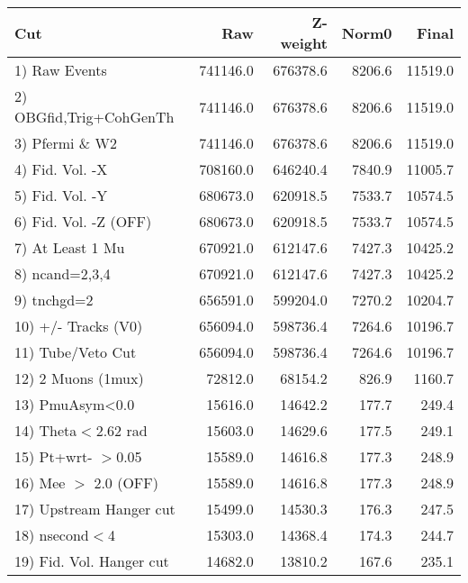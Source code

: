  \begin{table}[h!]\centering
 \begin{tabular}{||l||r|r|r|r||}
 \hline
 \hline
 Cut & Raw & Z-weight & Norm0 & Final \\
 \hline
  1) Raw Events           &    741146.0 &    676378.6 &      8206.6 &     11519.0 \\
  2) OBGfid,Trig+CohGenTh &    741146.0 &    676378.6 &      8206.6 &     11519.0 \\
  3) Pfermi \& W2         &    741146.0 &    676378.6 &      8206.6 &     11519.0 \\
  4) Fid. Vol. -X         &    708160.0 &    646240.4 &      7840.9 &     11005.7 \\
  5) Fid. Vol. -Y         &    680673.0 &    620918.5 &      7533.7 &     10574.5 \\
  6) Fid. Vol. -Z (OFF)   &    680673.0 &    620918.5 &      7533.7 &     10574.5 \\
  7) At Least 1 Mu        &    670921.0 &    612147.6 &      7427.3 &     10425.2 \\
  8) ncand=2,3,4          &    670921.0 &    612147.6 &      7427.3 &     10425.2 \\
  9) tnchgd=2             &    656591.0 &    599204.0 &      7270.2 &     10204.7 \\
 10) +/- Tracks (V0)      &    656094.0 &    598736.4 &      7264.6 &     10196.7 \\
 11) Tube/Veto Cut        &    656094.0 &    598736.4 &      7264.6 &     10196.7 \\
 12) 2 Muons (1mux)       &     72812.0 &     68154.2 &       826.9 &      1160.7 \\
 13) PmuAsym<0.0          &     15616.0 &     14642.2 &       177.7 &       249.4 \\
 14) Theta$<$2.62 rad     &     15603.0 &     14629.6 &       177.5 &       249.1 \\
 15) Pt+wrt- $>$0.05      &     15589.0 &     14616.8 &       177.3 &       248.9 \\
 16) Mee $>$ 2.0  (OFF)   &     15589.0 &     14616.8 &       177.3 &       248.9 \\
 17) Upstream Hanger cut  &     15499.0 &     14530.3 &       176.3 &       247.5 \\
 18) nsecond$<$4          &     15303.0 &     14368.4 &       174.3 &       244.7 \\
 19) Fid. Vol. Hanger cut &     14682.0 &     13810.2 &       167.6 &       235.1 \\

\end{tabular}
\end{table}
